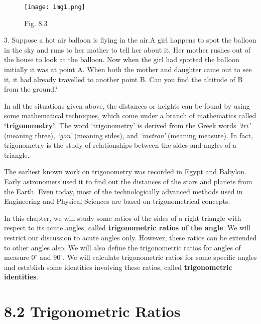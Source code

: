 \documentclass[11pt,a4paper]{article}
\begin{document}
\begin{wrapfigure}{r}{0.43\textwidth}
  \centering
  \vspace{-1em}
  \texttt{[image: img1.png]}
  \caption*{\small Fig. 8.3}
\end{wrapfigure}

3. Suppose a hot air balloon is flying in the air.A girl happens to spot the balloon in the sky and runs to her mother to tell her about it. Her mother rushes out of the house to look at the balloon. Now when the girl had spotted the balloon initially it was at point A. When both the mother and daughter came out to see it, it had already travelled to another point B. Can you find the altitude of B from the ground?

\vspace{1em}

In all the situations given above, the distances or heights can be found by using some mathematical techniques, which come under a branch of mathematics called \textbf{‘trigonometry’}. The word ‘trigonometry’ is derived from the Greek words \textit{‘tri’} (meaning three), \textit{‘gon’} (meaning sides), and \textit{‘metron’} (meaning measure). In fact, trigonometry is the study of relationships between the sides and angles of a triangle.

The earliest known work on trigonometry was recorded in Egypt and Babylon. Early astronomers used it to find out the distances of the stars and planets from the Earth. Even today, most of the technologically advanced methods used in Engineering and Physical Sciences are based on trigonometrical concepts.

\vspace{0.5em}
In this chapter, we will study some ratios of the sides of a right triangle with respect to its acute angles, called \textbf{trigonometric ratios of the angle}. We will restrict our discussion to acute angles only. However, these ratios can be extended to other angles also. We will also define the trigonometric ratios for angles of measure $0^\circ$ and $90^\circ$. We will calculate trigonometric ratios for some specific angles and establish some identities involving these ratios, called \textbf{trigonometric identities}.
\vspace{-0.5em}
\section*{8.2 Trigonometric Ratios}
\end{document}
